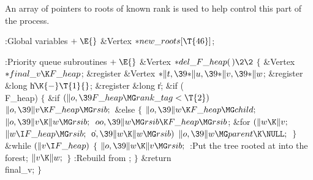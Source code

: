 An array of pointers to roots of known rank is used to help control
this part of the process.

\Y\B\4:Global variables\X${}\mathrel+\E{}$\6
\&{Vertex} ${}{*}\\{new\_roots}[\T{46}]{}$;\par
\fi

\B{}:Priority queue subroutines\X${}\mathrel+\E{}$\6
\1\1\&{Vertex} ${}{*}\\{del\_F\_heap}(\,)\2\2{}$\6
${}\{{}$\5
\1\&{Vertex} ${}{*}\\{final\_v}\K\\{F\_heap}{}$;\6
\&{register} \&{Vertex} ${}{*}\|t,\39{*}\|u,\39{*}\|v,\39{*}\|w{}$;\6
\&{register} \&{long} \|h${}\K{-}\T{1}{}$;\6
\&{register} \&{long} \|r;\7
\&{if} (\\{F\_heap})\5
${}\{{}$\1\6
\&{if} ${}(\|o,\39\\{F\_heap}\MG\\{rank\_tag}<\T{2}){}$\1\5
${}\|o,\39\|v\K\\{F\_heap}\MG\\{rsib};{}$\2\6
\&{else}\5
${}\{{}$\1\6
${}\|o,\39\|w\K\\{F\_heap}\MG\\{child};{}$\6
${}\|o,\39\|v\K\|w\MG\\{rsib};{}$\6
${}\\{oo},\39\|w\MG\\{rsib}\K\\{F\_heap}\MG\\{rsib}{}$;\6
\&{for} ${}(\|w\K\|v;{}$ ${}\|w\I\\{F\_heap}\MG\\{rsib};{}$ \|o${},\39\|w\K\|w%
\MG\\{rsib}){}$\1\5
${}\|o,\39\|w\MG\\{parent}\K\NULL;{}$\2\6
\4${}\}{}$\2\6
\&{while} ${}(\|v\I\\{F\_heap}){}$\5
${}\{{}$\1\6
${}\|o,\39\|w\K\|v\MG\\{rsib};{}$\6
:Put the tree rooted at  into the  forest\X;\6
${}\|v\K\|w;{}$\6
\4${}\}{}$\2\6
:Rebuild  from \X;\6
\4${}\}{}$\2\6
\&{return} \\{final\_v};\6
\4${}\}{}$\2\par
\fi

